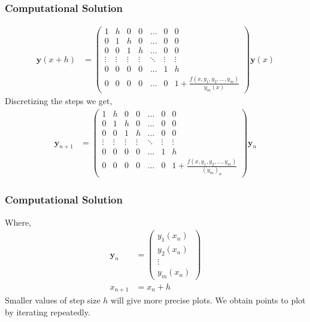 \documentclass{beamer}
\providecommand{\brak}[1]{\ensuremath{\left(#1\right)}}
\theoremstyle{remark}
\newcommand{\myvec}[1]{\ensuremath{\begin{pmatrix}#1\end{pmatrix}}}
\let\vec\mathbf
\numberwithin{equation}{section}
\begin{document}
		\begin{frame}
			\frametitle{Computational Solution}
      {\small
      \begin{align}
        \vec{y}\brak{x+h} &= \myvec{1 & h & 0 & 0 & \dots & 0 & 0\\ 0 & 1 & h & 0 & \dots & 0 & 0\\0 & 0 & 1 & h & \dots & 0 & 0\\\vdots & \vdots & \vdots & \vdots& \ddots & \vdots & \vdots\\
  0 & 0 & 0 & 0 & \dots & 1 & h\\0 & 0 & 0 & 0 & \dots & 0 & 1+\frac{f\brak{x, y_1, y_2, \dots, y_m}}{y_m\brak{x}}}\vec{y}\brak{x}
      \end{align}
      }
Discretizing the steps we get,
      {\small
\begin{align}
  \vec{y}_{n+1}&=\myvec{1 & h & 0 & 0 & \dots & 0 & 0\\ 0 & 1 & h & 0 & \dots & 0 & 0\\0 & 0 & 1 & h & \dots & 0 & 0\\\vdots & \vdots & \vdots & \vdots& \ddots & \vdots & \vdots\\
  0 & 0 & 0 & 0 & \dots & 1 & h\\0 & 0 & 0 & 0 & \dots & 0 &1+\frac{f\brak{x, y_1, y_2, \dots, y_m}}{\brak{y_m}_n}}\vec{y}_{n}
\end{align}
      }
		\end{frame}
		\begin{frame}[fragile]
			\frametitle{Computational Solution}
Where,
\begin{align}
  \vec{y}_n&=\myvec{y_1\brak{x_n} \\ y_2\brak{x_n} \\ \vdots \\ y_m\brak{x_n}}\\
  x_{n+1}&=x_n+h  
\end{align}
Smaller values of step size $h$ will give more precise plots. We obtain points to plot by iterating repeatedly. 
		\end{frame}
\end{document}
